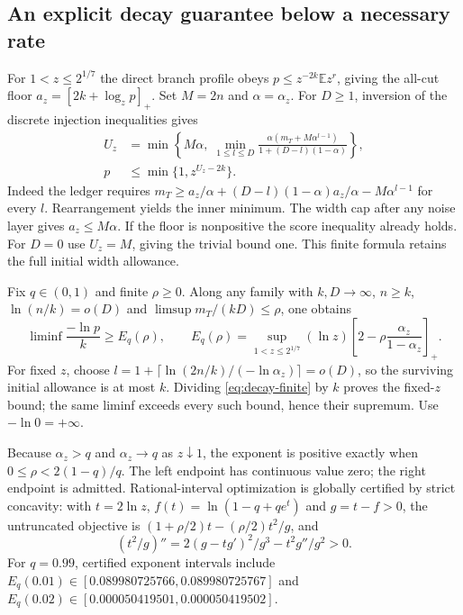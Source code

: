 \documentclass[11pt,a4paper]{article}
\numberwithin{equation}{section}
\theoremstyle{remark}\newtheorem*{remark}{Interpretation}
\newcommand{\E}{\mathbb E}
\begin{document}
\subsection{An explicit decay guarantee below a necessary rate}
For $1<z\le2^{1/7}$ the direct branch profile obeys $p\le z^{-2k}\E z^r$, giving the all-cut floor $a_z=[2k+\log_zp]_+$. Set $M=2n$ and $\alpha=\alpha_z$. For $D\ge1$, inversion of the discrete injection inequalities gives
\begin{equation}
\begin{aligned}
U_z&=\min\left\{M\alpha,\;
\min_{1\le l\le D}\frac{\alpha(m_T+M\alpha^{l-1})}{1+(D-l)(1-\alpha)}\right\},\\
p&\le\min\{1,z^{U_z-2k}\}.
\end{aligned}
\label{eq:decay-finite}
\end{equation}
Indeed the ledger requires $m_T\ge a_z/\alpha+(D-l)(1-\alpha)a_z/\alpha-M\alpha^{l-1}$ for every $l$. Rearrangement yields the inner minimum. The width cap after any noise layer gives $a_z\le M\alpha$. If the floor is nonpositive the score inequality already holds. For $D=0$ use $U_z=M$, giving the trivial bound one. This finite formula retains the full initial width allowance.

Fix $q\in(0,1)$ and finite $\rho\ge0$. Along any family with $k,D\to\infty$, $n\ge k$, $\ln(n/k)=o(D)$ and $\limsup m_T/(kD)\le\rho$, one obtains
\begin{equation}
\liminf\frac{-\ln p}{k}\ge E_q(\rho),\qquad
E_q(\rho)=\sup_{1<z\le2^{1/7}}(\ln z)
\left[2-\rho\frac{\alpha_z}{1-\alpha_z}\right]_+.
\label{eq:decay-asymptotic}
\end{equation}
For fixed $z$, choose $l=1+\lceil\ln(2n/k)/(-\ln\alpha_z)\rceil=o(D)$, so the surviving initial allowance is at most $k$. Dividing \eqref{eq:decay-finite} by $k$ proves the fixed-$z$ bound; the same liminf exceeds every such bound, hence their supremum. Use $-\ln0=+\infty$.

Because $\alpha_z>q$ and $\alpha_z\to q$ as $z\downarrow1$, the exponent is positive exactly when $0\le\rho<2(1-q)/q$. The left endpoint has continuous value zero; the right endpoint is admitted. Rational-interval optimization is globally certified by strict concavity: with $t=2\ln z$, $f(t)=\ln(1-q+qe^t)$ and $g=t-f>0$, the untruncated objective is $(1+\rho/2)t-(\rho/2)t^2/g$, and
\[
\left(t^2/g\right)''=2(g-tg')^2/g^3-t^2g''/g^2>0.
\]
For $q=0.99$, certified exponent intervals include $E_q(0.01)\in[0.089980725766,0.089980725767]$ and $E_q(0.02)\in[0.000050419501,0.000050419502]$.
\end{document}
